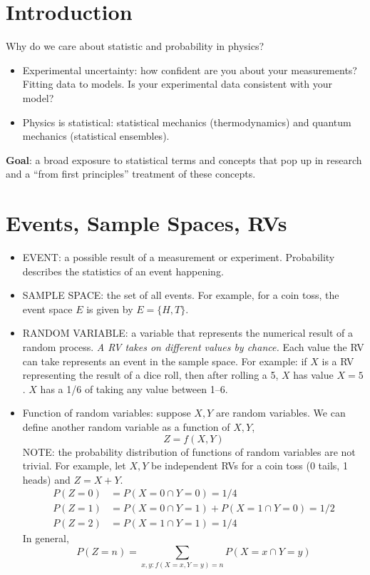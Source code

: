 \documentclass[12pt]{article}
\numberwithin{equation}{section}
\begin{document}
	
\section{Introduction}

Why do we care about statistic and probability in physics?
\begin{itemize}
	\item Experimental uncertainty: how confident are you about your measurements? Fitting data to models. Is your experimental data consistent with your model? 
	\item Physics is statistical: statistical mechanics (thermodynamics) and quantum mechanics (statistical ensembles).
\end{itemize}

\textbf{Goal}: a broad exposure to statistical terms and concepts that pop up in research and a ``from first principles'' treatment of these concepts. 

\section{Events, Sample Spaces, RVs}

\begin{itemize}
	\item EVENT: a possible result of a measurement or experiment. Probability describes the statistics of an event happening.
	\item SAMPLE SPACE: the set of all events. For example, for a coin toss, the event space $ E $ is given by $ E = \{H, T\} $.
	\item RANDOM VARIABLE: a variable that represents the numerical result of a random process.  \textit{A RV takes on different values by chance.} Each value the RV can take represents an event in the sample space. For example: if $ X $ is a RV representing the result of a dice roll, then after rolling a 5, $ X $ has value $ X=5 $. $ X $ has a 1/6 of taking any value between 1--6. 
	\item Function of random variables: suppose $ X,Y $ are random variables. We can define another random variable as a function of $ X,Y $,
	\begin{equation}
			Z = f(X,Y)
	\end{equation}
NOTE: the probability distribution of functions of random variables are not trivial. For example, let $ X,Y $ be independent RVs for a coin toss (0 tails, 1 heads) and $ Z = X+Y $.
\begin{align}
	P(Z=0) &= P(X=0\cap Y=0) = 1/4\\
	P(Z=1) &= P(X=0\cap Y=1) + P(X=1\cap Y=0) = 1/2\\
	P(Z=2) &= P(X=1\cap Y=1) = 1/4
\end{align}
In general,
\begin{equation}
		P(Z=n) = \sum_{x,y: f(X=x,Y=y)=n}P(X=x\cap Y=y)
\end{equation}
\end{itemize}
\end{document}
